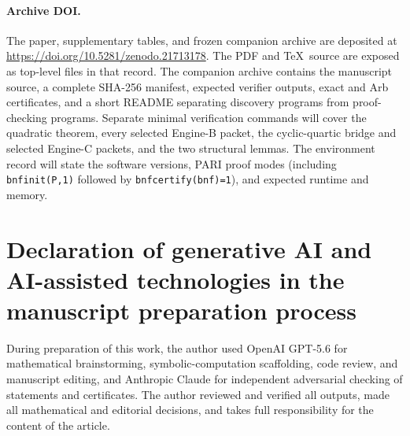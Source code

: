 \documentclass[11pt]{article}
\begin{document}
\paragraph{Archive DOI.}
The paper, supplementary tables, and frozen companion archive are
deposited at
\url{https://doi.org/10.5281/zenodo.21713178}.  The PDF and
\TeX\ source are exposed as top-level files in that record.  The
companion archive contains the manuscript source, a complete
SHA-256 manifest, expected verifier outputs, exact and Arb
certificates, and a short README separating discovery programs from
proof-checking programs.  Separate minimal verification commands will
cover the quadratic theorem, every selected Engine-B packet, the
cyclic-quartic bridge and selected Engine-C packets, and the two
structural lemmas.  The environment record will state the software
versions, PARI proof modes (including
\texttt{bnfinit(P,1)} followed by
\texttt{bnfcertify(bnf)=1}), and expected runtime and memory.

\section*{Declaration of generative AI and AI-assisted technologies
in the manuscript preparation process}

During preparation of this work, the author used OpenAI GPT-5.6 for
mathematical brainstorming, symbolic-computation scaffolding, code
review, and manuscript editing, and Anthropic Claude for
independent adversarial checking of statements and certificates.  The
author reviewed and verified all outputs, made all mathematical and
editorial decisions, and takes full responsibility for the content of
the article.
\end{document}
